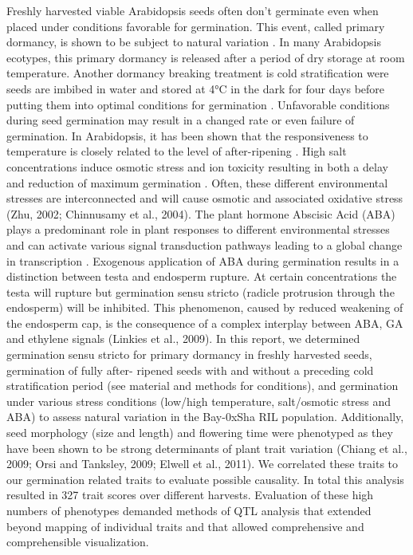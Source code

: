 \documentclass[8pt, twoside, a5paper]{report}
\begin{document}
Freshly harvested viable Arabidopsis seeds often don't germinate even when placed under conditions favorable for germination. This event, 
called primary dormancy, is shown to be subject to natural variation \cite{Bentsink:2010}. In many Arabidopsis ecotypes, this primary 
dormancy is released after a period of dry storage at room temperature. Another dormancy breaking treatment is cold stratification were 
seeds are imbibed in water and stored at 4°C in the dark for four days before putting them into optimal conditions for germination 
\cite{Finch-Savage:2006}. Unfavorable conditions during seed germination may result in a changed rate or even failure 
of germination. In Arabidopsis, it has been shown that the responsiveness to temperature is closely related to the level of after-ripening 
\cite{Tamura:2006}. High salt concentrations induce osmotic stress and ion toxicity resulting in both a delay and reduction of maximum 
germination \cite{Galpaz:2010}. Often, these different environmental stresses are interconnected and will cause osmotic and 
associated oxidative stress (Zhu, 2002; Chinnusamy et al., 2004). The plant hormone Abscisic Acid (ABA) plays a predominant role in 
plant responses to different environmental stresses and can activate various signal transduction pathways leading to a global change in 
transcription \cite{Finkelstein:2002, Xiong:2002}. Exogenous application of ABA during germination results in a distinction 
between testa and endosperm rupture. At certain concentrations the testa will rupture but germination sensu stricto (radicle protrusion 
through the endosperm) will be inhibited. This phenomenon, caused by reduced weakening of the endosperm cap, is the consequence of a 
complex interplay between ABA, GA and ethylene signals (Linkies et al., 2009). In this report, we determined germination sensu stricto 
for primary dormancy in freshly harvested seeds, germination of fully after- ripened seeds with and without a preceding cold stratification
period (see material and methods for conditions), and germination under various stress conditions (low/high temperature, salt/osmotic 
stress and ABA) to assess natural  variation in the Bay-0xSha RIL population. Additionally, seed morphology (size and length) and flowering 
time were phenotyped as they have been shown to be strong determinants of plant trait variation (Chiang et al., 2009; Orsi and Tanksley, 
2009; Elwell et al., 2011). We correlated these traits to our germination related traits to evaluate possible causality. In total this 
analysis resulted in 327 trait scores over different harvests. Evaluation of these high numbers of phenotypes demanded methods of QTL
analysis that extended beyond mapping of individual traits and that allowed comprehensive and comprehensible visualization.
\end{document}
